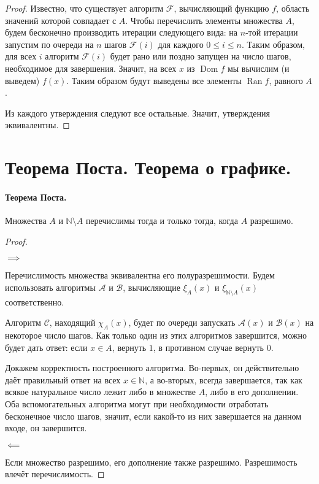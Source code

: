 \documentclass{article}
\begin{document}
\begin{proof}
        Известно, что существует алгоритм \(\mathcal{F}\), вычисляющий функцию \(f\), область значений
        которой совпадает с \(A\). Чтобы перечислить элементы множества \(A\), будем бесконечно
        производить итерации следующего вида: на \(n\)-той итерации запустим по очереди на \(n\)
        шагов \(\mathcal{F}(i)\) для каждого \(0 \leqslant i \leqslant n\). Таким образом, для всех \(i\)
        алгоритм \(\mathcal{F}(i)\) будет рано или поздно запущен на число шагов, необходимое для
        завершения.  Значит, на всех \(x\) из \(\operatorname{Dom} f\) мы вычислим (и выведем) \(f(x)\).
        Таким образом будут выведены все элементы \(\operatorname{Ran} f\), равного \(A\).

        Из каждого утверждения следуют все остальные. Значит, утверждения эквивалентны.
    \end{proof}

    \section{Теорема Поста. Теорема о графике.}

    \paragraph{Теорема Поста.} \label{Post} Множества \(A\) и \(\mathbb{N} \setminus A\) перечислимы
    тогда и только тогда, когда \(A\) разрешимо.

    \begin{proof} \

        \(\implies\)

        Перечислимость множества эквивалентна его полуразрешимости. Будем использовать алгоритмы
        \(\mathcal{A}\) и \(\mathcal{B}\), вычисляющие \(\xi_{A}(x)\) и \(\xi_{\mathbb{N} \setminus A}(x)\)
        соответственно.

        Алгоритм \(\mathcal{C}\), находящий \(\chi_A(x)\), будет по очереди запускать \(\mathcal{A}(x)\) и
        \(\mathcal{B}(x)\) на некоторое число шагов. Как только один из этих алгоритмов завершится, можно
        будет дать ответ: если \(x \in A\), вернуть \(1\), в противном случае вернуть \(0\).

        Докажем корректность построенного алгоритма. Во-первых, он действительно даёт правильный
        ответ на всех \(x \in \mathbb{N}\), а во-вторых, всегда завершается, так как всякое
        натуральное число лежит либо в множестве \(A\), либо в его дополнении. Оба вспомогательных
        алгоритма могут при необходимости отработать бесконечное число шагов, значит, если какой-то
        из них завершается на данном входе, он завершится.

        \(\impliedby\)

        Если множество разрешимо, его дополнение также разрешимо. Разрешимость влечёт
        перечислимость.
    \end{proof}
\end{document}

